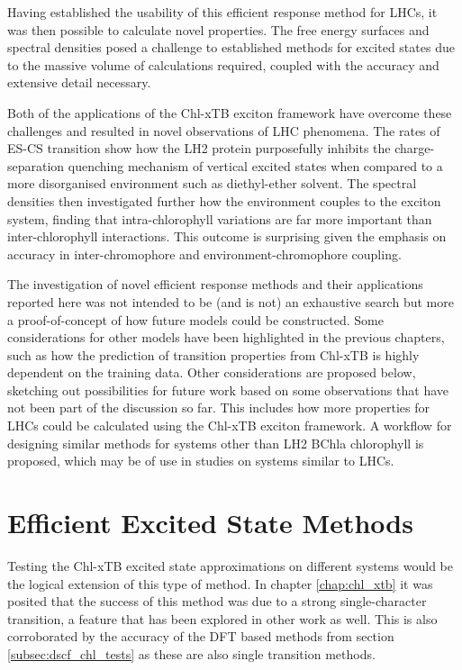 Having established the usability of this efficient response method for LHCs, it
was then possible to calculate novel properties. The free energy surfaces and spectral
densities posed a challenge to established methods for excited states due to the
massive volume of calculations required, coupled with the accuracy and extensive 
detail necessary.

Both of the applications of the Chl-xTB exciton framework have overcome these challenges
and resulted in novel observations of LHC phenomena. The rates of ES-CS transition 
show how the LH2 protein purposefully inhibits the charge-separation quenching mechanism
of vertical excited states when compared to a more disorganised environment such as
 diethyl-ether solvent. The spectral densities then investigated further how the
environment couples to the exciton system, finding that intra-chlorophyll variations
are far more important than inter-chlorophyll interactions. This outcome is surprising 
given the emphasis on accuracy in inter-chromophore and environment-chromophore coupling.

The investigation of novel efficient response methods and their applications reported
here was not intended to be (and is not) an exhaustive search but more a proof-of-concept
of how future models could be constructed. Some considerations for other models 
have been highlighted in the previous chapters, such as how the prediction of transition
properties from Chl-xTB is highly dependent on the training data. Other considerations
are proposed below, sketching out possibilities for future work based on some observations
that have not been part of the discussion so far. This includes how more properties 
for LHCs could be calculated using the Chl-xTB exciton framework. A workflow for
designing similar methods for systems other than LH2 BChla chlorophyll is proposed,
which may be of use in studies on systems similar to LHCs.

\section{Efficient Excited State Methods}
\label{sec:future_response_methods}

Testing the Chl-xTB excited state approximations on different systems would be
the logical extension of this type of method. In chapter \ref{chap:chl_xtb} it was
posited that the success of this method was due to a strong single-character transition,
a feature that has been explored in other work as well. This is also corroborated 
by the accuracy of the DFT based \dscf methods from section \ref{subsec:dscf_chl_tests}
as these are also single transition methods.

